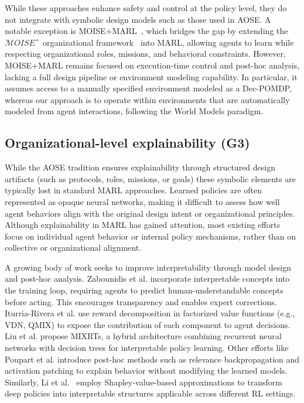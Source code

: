\documentclass[pdflatex,sn-mathphys-num]{sn-jnl}%
\theoremstyle{thmstyleone}%
\theoremstyle{thmstyletwo}%
\theoremstyle{thmstylethree}%
\begin{document}
While these approaches enhance safety and control at the policy level, they do not integrate with symbolic design models such as those used in AOSE. A notable exception is MOISE+MARL~\cite{soule2025moisemarl}, which bridges the gap by extending the $\mathcal{M}OISE^+$ organizational framework~\cite{Hubner2002} into MARL, allowing agents to learn while respecting organizational roles, missions, and behavioral constraints. However, MOISE+MARL remains focused on execution-time control and post-hoc analysis, lacking a full design pipeline or environment modeling capability. In particular, it assumes access to a manually specified environment modeled as a Dec-POMDP, whereas our approach is to operate within environments that are automatically modeled from agent interactions, following the World Models paradigm.

\subsection{Organizational-level explainability (G3)}

While the AOSE tradition ensures explainability through structured design artifacts (such as protocols, roles, missions, or goals) these symbolic elements are typically lost in standard MARL approaches. Learned policies are often represented as opaque neural networks, making it difficult to assess how well agent behaviors align with the original design intent or organizational principles. Although explainability in MARL has gained attention, most existing efforts focus on individual agent behavior or internal policy mechanisms, rather than on collective or organizational alignment.

A growing body of work seeks to improve interpretability through model design and post-hoc analysis. Zabounidis et al.\cite{zabounidis2023concept} incorporate interpretable concepts into the training loop, requiring agents to predict human-understandable concepts before acting. This encourages transparency and enables expert corrections. Iturria-Rivera et al.\cite{iturria2024explainable} use reward decomposition in factorized value functions (e.g., VDN, QMIX) to expose the contribution of each component to agent decisions. Liu et al.\cite{liu2025} propose MIXRTs, a hybrid architecture combining recurrent neural networks with decision trees for interpretable policy learning. Other efforts like Poupart et al.\cite{poupart2025perspectives} introduce post-hoc methods such as relevance backpropagation and activation patching to explain behavior without modifying the learned models. Similarly, Li et al.~\cite{li2025from} employ Shapley-value-based approximations to transform deep policies into interpretable structures applicable across different RL settings.
\end{document}
